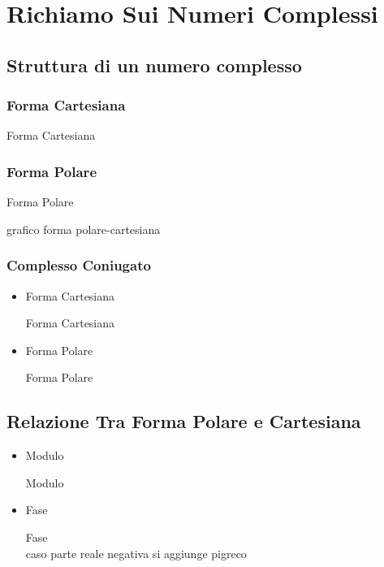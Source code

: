 \section{Richiamo Sui Numeri Complessi}
\subsection{Struttura di un numero complesso}

    \subsubsection{Forma Cartesiana}
            \begin{center}
                Forma Cartesiana
            \end{center}
            
    \subsubsection{Forma Polare}
    \begin{center}
        Forma Polare
    \end{center}
    grafico forma polare-cartesiana
    
    \subsubsection{Complesso Coniugato}
        \begin{itemize}
            \item {Forma Cartesiana
                \begin{center}
                    Forma Cartesiana
                \end{center}
            }
            \item {Forma Polare
                \begin{center}
                    Forma Polare
                \end{center}
            }           
        \end{itemize}


\subsection{Relazione Tra Forma Polare e Cartesiana}
    \begin{itemize}
        \item {Modulo
            \begin{center}
                Modulo
            \end{center}
        }
        \item {Fase
            \begin{center}
                Fase\\
                caso parte reale negativa si aggiunge pigreco
            \end{center}
        }
    \end{itemize}


